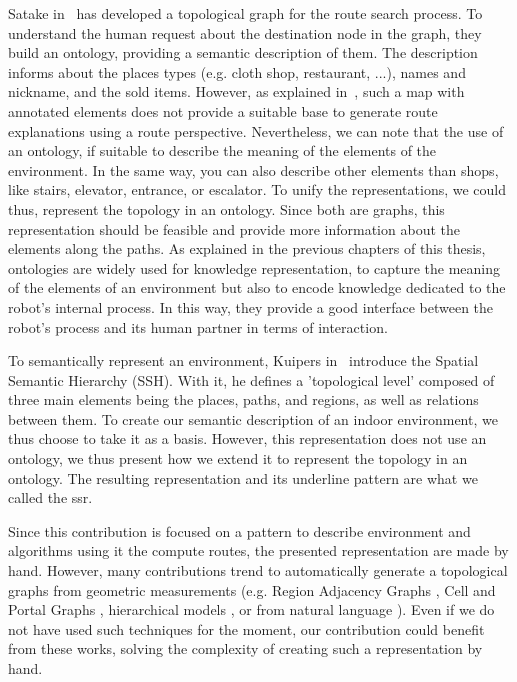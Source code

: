 Satake in~\cite{satake_2015_field} has developed a topological graph for the route search process. To understand the human request about the destination node in the graph, they build an ontology, providing a semantic description of them. The description informs about the places types (e.g. cloth shop, restaurant, ...), names and nickname, and the sold items. However, as explained in~\cite{morales_2015_building}, such a map with annotated elements does not provide a suitable base to generate route explanations using a route perspective. Nevertheless, we can note that the use of an ontology, if suitable to describe the meaning of the elements of the environment. In the same way, you can also describe other elements than shops, like stairs, elevator, entrance, or escalator. To unify the representations, we could thus, represent the topology in an ontology. Since both are graphs, this representation should be feasible and provide more information about the elements along the paths. As explained in the previous chapters of this thesis, ontologies are widely used for knowledge representation, to capture the meaning of the elements of an environment but also to encode knowledge dedicated to the robot's internal process. In this way, they provide a good interface between the robot's process and its human partner in terms of interaction.%

To semantically represent an environment, Kuipers in~\cite{kuipers_2000_spatial} introduce the Spatial Semantic Hierarchy (SSH). With it, he defines a 'topological level' composed of three main elements being the places, paths, and regions, as well as relations between them. To create our semantic description of an indoor environment, we thus choose to take it as a basis. However, this representation does not use an ontology, we thus present how we extend it to represent the topology in an ontology. The resulting representation and its underline pattern are what we called the \acrfull{ssr}.

Since this contribution is focused on a pattern to describe environment and algorithms using it the compute routes, the presented representation are made by hand. However, many contributions trend to automatically generate a topological graphs from geometric measurements (e.g. Region Adjacency Graphs \cite{kuipers_2004_local}, Cell and Portal Graphs \cite{lefebvre_2003_automatic}, hierarchical models \cite{lorenz_2006_hybrid}, or from natural language \cite{hemachandra_2014_learning}). Even if we do not have used such techniques for the moment, our contribution could benefit from these works, solving the complexity of creating such a representation by hand.

